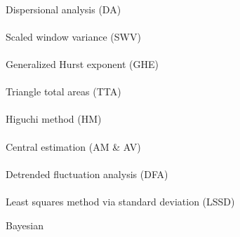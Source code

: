 \documentclass[
  sn-vancouver,
  Numbered,
  referee,
  lineno]{sn-jnl}
\makeatletter
\let\oldparagraph\paragraph
\renewcommand{\paragraph}{
    \@ifstar
      \xxxParagraphStar
      \xxxParagraphNoStar
  }
\newcommand{\xxxParagraphStar}[1]{\oldparagraph*{#1}\mbox{}}
\newcommand{\xxxParagraphNoStar}[1]{\oldparagraph{#1}\mbox{}}
\makeatother
\begin{document}
\paragraph{Dispersional analysis (DA)}\label{dispersional-analysis-da}

\citep{bassingthwaightePhysiologicalHeterogeneityFractals1988}

\citet{donaTemporalFractalAnalysis2017}
\citet{donaFractalAnalysisBrain2017}

\paragraph{Scaled window variance
(SWV)}\label{scaled-window-variance-swv}

\citet{donaTemporalFractalAnalysis2017}
\citet{donaFractalAnalysisBrain2017}

\paragraph{Generalized Hurst exponent
(GHE)}\label{generalized-hurst-exponent-ghe}

\paragraph{Triangle total areas (TTA)}\label{triangle-total-areas-tta}

\paragraph{Higuchi method (HM)}\label{higuchi-method-hm}

\paragraph{Central estimation (AM \&
AV)}\label{central-estimation-am-av}

\paragraph{Detrended fluctuation analysis
(DFA)}\label{detrended-fluctuation-analysis-dfa}

\paragraph{Least squares method via standard deviation
(LSSD)}\label{least-squares-method-via-standard-deviation-lssd}

Bayesian
\end{document}
